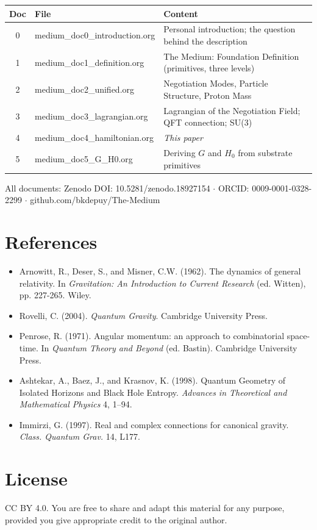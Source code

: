 \documentclass[11pt,letterpaper]{article}
\begin{document}
\begin{center}
\begin{tabular}{clp{9cm}}
\toprule
\textbf{Doc} & \textbf{File} & \textbf{Content}\\[0pt]
\midrule
0 & medium\_doc0\_introduction.org & Personal introduction; the question behind the description\\[0pt]
1 & medium\_doc1\_definition.org & The Medium: Foundation Definition (primitives, three levels)\\[0pt]
2 & medium\_doc2\_unified.org & Negotiation Modes, Particle Structure, Proton Mass\\[0pt]
3 & medium\_doc3\_lagrangian.org & Lagrangian of the Negotiation Field; QFT connection; SU(3)\\[0pt]
4 & medium\_doc4\_hamiltonian.org & \emph{This paper}\\[0pt]
5 & medium\_doc5\_G\_H0.org & Deriving \(G\) and \(H_0\) from substrate primitives\\[0pt]
\bottomrule
\end{tabular}
\end{center}

All documents: Zenodo DOI: 10.5281/zenodo.18927154 \(\cdot\) ORCID: 0009-0001-0328-2299 \(\cdot\) github.com/bkdepuy/The-Medium

\section{References}
\label{sec:orga93454b}

\begin{itemize}
\item Arnowitt, R., Deser, S., and Misner, C.W. (1962). The dynamics of general relativity. In \emph{Gravitation: An Introduction to Current Research} (ed. Witten), pp. 227-265. Wiley.
\item Rovelli, C. (2004). \emph{Quantum Gravity}. Cambridge University Press.
\item Penrose, R. (1971). Angular momentum: an approach to combinatorial space-time. In \emph{Quantum Theory and Beyond} (ed. Bastin). Cambridge University Press.
\item Ashtekar, A., Baez, J., and Krasnov, K. (1998). Quantum Geometry of Isolated Horizons and Black Hole Entropy. \emph{Advances in Theoretical and Mathematical Physics} 4, 1--94.
\item Immirzi, G. (1997). Real and complex connections for canonical gravity. \emph{Class. Quantum Grav.} 14, L177.
\end{itemize}

\section{License}
\label{sec:orgd3b81f2}

CC BY 4.0. You are free to share and adapt this material for any purpose, provided you give appropriate credit to the original author.
\end{document}
